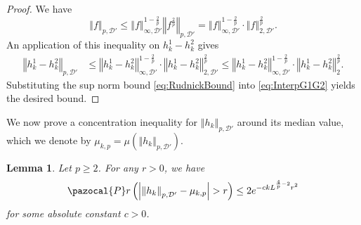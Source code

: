 \documentclass[12pt, a4paper]{amsart}
\newtheorem{lemma}[theorem]{Lemma}
\theoremstyle{definition}
\newcommand {\1} {\mathbf{1}}
\newcommand{\prob}{\pazocal{P}r}
\newcommand {\Dc} {\mathcal{D}}
\numberwithin{equation}{section}
\begin{document}
\begin{proof}
We have
\[
\left\Vert f\right\Vert _{p,\Dc'}\le\left\Vert f\right\Vert _{\infty,\Dc'}^{1-\frac{2}{p}}\left\Vert f^{\frac{2}{p}}\right\Vert _{p,\Dc'}=\left\Vert f\right\Vert _{\infty,\Dc'}^{1-\frac{2}{p}}\cdot \left\Vert f\right\Vert _{2,\Dc'}^{\frac{2}{p}}.
\]
An application of this inequality on $h_{k}^{1}-h_{k}^{2}$ gives
\begin{align}
\left\Vert h_{k}^{1}-h_{k}^{2}\right\Vert _{p,\Dc'} & \le\left\Vert h_{k}^{1}-h_{k}^{2}\right\Vert _{\infty,\Dc'}^{1-\frac{2}{p}}\cdot \left\Vert h_{k}^{1}-h_{k}^{2}\right\Vert _{2,\Dc'}^{\frac{2}{p}}\le
\left\Vert h_{k}^{1}-h_{k}^{2}\right\Vert _{\infty,\Dc'}^{1-\frac{2}{p}}\cdot \left\Vert h_{k}^{1}-h_{k}^{2}\right\Vert _{2}^{\frac{2}{p}}.\label{eq:InterpG1G2}
\end{align}
Substituting the sup norm bound \eqref{eq:RudnickBound} into \eqref{eq:InterpG1G2} yields the desired bound.
\end{proof}
%
We now prove a concentration inequality for $\left\Vert h_{k}\right\Vert _{p,\Dc'}$
around its median value, which we denote by $\mu_{k,p}=\mu\left(\left\Vert h_{k}\right\Vert _{p,\Dc'}\right)$.
\begin{lemma}
\label{lem:Concen}
Let $p\ge2$.
For any $r>0$, we have
\begin{equation} \label{eq:LpConcen}
\prob\left(\left|\left\Vert h_{k}\right\Vert _{p,\Dc'}-\mu_{k,p}\right|>r\right)\le 2e^{-c k L^{\frac{4}{p}-2} r^2}
\end{equation}
for some absolute constant $c>0$.
\end{lemma}
\end{document}
